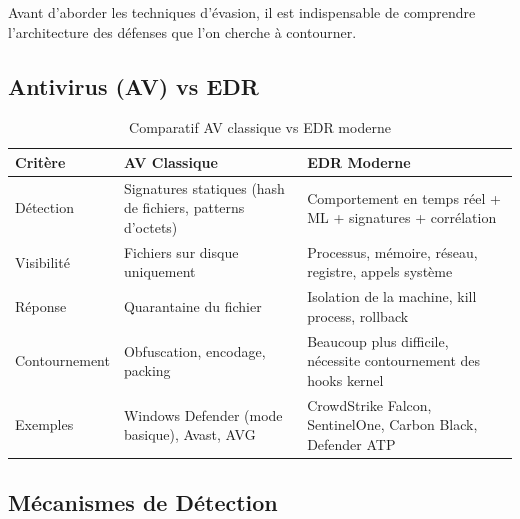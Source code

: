Avant d'aborder les techniques d'évasion, il est indispensable de comprendre
l'architecture des défenses que l'on cherche à contourner.

\subsection{Antivirus (AV) vs EDR}
\label{subsec:av_vs_edr}

\begin{table}[htbp]
\centering
\caption{Comparatif AV classique vs EDR moderne}
\label{tab:av_vs_edr}
\begin{tabular}{p{3cm}p{5.5cm}p{5cm}}
\toprule
\textbf{Critère} & \textbf{AV Classique} & \textbf{EDR Moderne} \\
\midrule
Détection
    & Signatures statiques (hash de fichiers, patterns d'octets)
    & Comportement en temps réel + ML + signatures + corrélation \\
\addlinespace
Visibilité
    & Fichiers sur disque uniquement
    & Processus, mémoire, réseau, registre, appels système \\
\addlinespace
Réponse
    & Quarantaine du fichier
    & Isolation de la machine, kill process, rollback \\
\addlinespace
Contournement
    & Obfuscation, encodage, packing
    & Beaucoup plus difficile, nécessite contournement des hooks kernel \\
\addlinespace
Exemples
    & Windows Defender (mode basique), Avast, AVG
    & CrowdStrike Falcon, SentinelOne, Carbon Black, Defender ATP \\
\bottomrule
\end{tabular}
\end{table}

\subsection{Mécanismes de Détection}
\label{subsec:detection_mechanisms}

